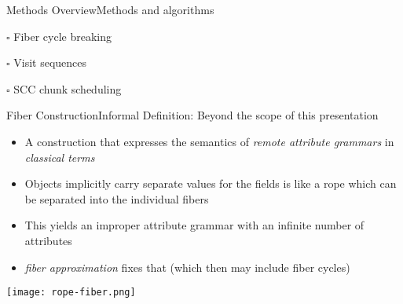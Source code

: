 
\begin{frame}{Methods Overview}{Methods and algorithms}
     \begin{description}
        \item $\square$ \alert{Fiber cycle breaking}
        \item $\square$  Visit sequences
        \item $\square$  SCC chunk scheduling
    \end{description}
\end{frame}


\begin{frame}{Fiber Construction}{Informal Definition: Beyond the scope of this presentation}

\small
\begin{itemize}
    \item A construction that expresses the semantics of \emph{remote attribute grammars} in \emph{classical terms}
    \item Objects \alert{implicitly} carry separate values for the fields is like a \alert{rope} which can be separated into the individual fibers
    \item This yields an improper attribute grammar with an infinite number of attributes
    \item \emph{fiber approximation} fixes that (which then may include \alert{fiber cycles})
\end{itemize}

\begin{center}
\texttt{[image: rope-fiber.png]}
\end{center}
    
\end{frame}



